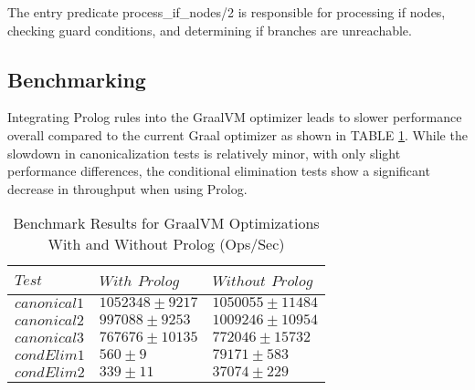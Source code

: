 The entry predicate process_if_nodes/2 is responsible for processing if nodes, checking guard conditions, and determining if branches are unreachable.

\subsection{Benchmarking}
Integrating Prolog rules into the GraalVM optimizer leads to slower performance overall compared to the current Graal optimizer as shown in TABLE \ref{table:benchmark}. While the slowdown in canonicalization tests is relatively minor, with only slight performance differences, the conditional elimination tests show a significant decrease in throughput when using Prolog.

\begin{table}[h]
    \centering
    \fontsize{9pt}{9pt}
    \begin{tabular}{|l|l|l|}
        \hline
        $Test$ & $With$ $Prolog$ & $Without$ $Prolog$ \\
        \hline
        $canonical1$ & $1052348 \pm 9217$ & $1050055 \pm 11484$ \\
        \hline
        $canonical2$ & $997088 \pm 9253$ & $1009246 \pm 10954$  \\
        \hline
        $canonical3$ & $767676 \pm 10135$ & $772046 \pm 15732$  \\
        \hline
        $condElim1$ & $560 \pm 9$ & $79171 \pm 583$ \\
        \hline
        $condElim2$ & $339 \pm 11$ & $37074 \pm 229$  \\
        \hline
    \end{tabular}
    \caption{Benchmark Results for GraalVM Optimizations With and Without Prolog (Ops/Sec)}
    \label{table:benchmark}
\end{table} 





